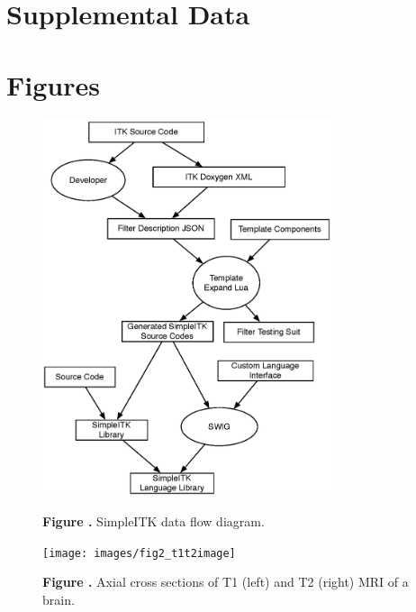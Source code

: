 \documentclass{frontiersMED} %
\begin{document}
\section*{Supplemental Data}




\section*{Figures}


\begin{figure}
\begin{center}
\includegraphics[width=8.5cm]{images/fig1_dataflow}
\end{center}
 \textbf{\label{fig:01} Figure .}{ SimpleITK data flow diagram. }
\end{figure}

\begin{figure}
\begin{center}
\texttt{[image: images/fig2\_t1t2image]}
\end{center}
 \textbf{\label{fig:02} Figure .}{ Axial cross sections of T1 (left) and T2 (right) MRI of a brain. }
\end{figure}
\end{document}
